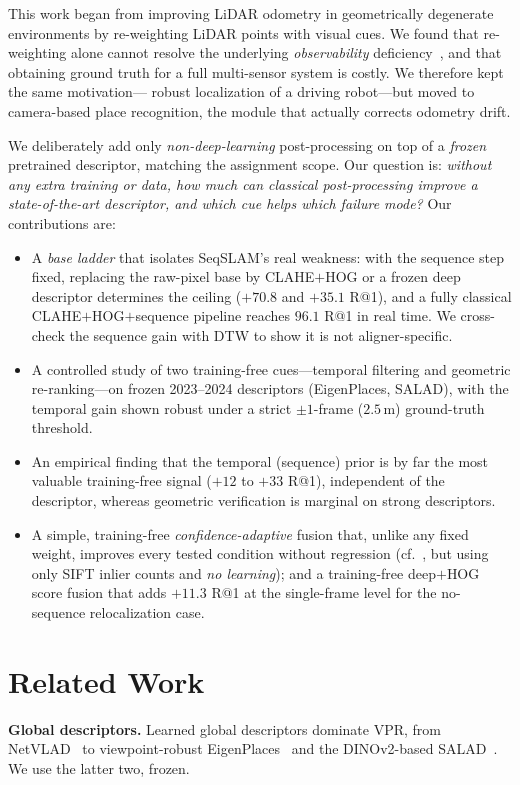 \documentclass[10pt,twocolumn,letterpaper]{article}
\begin{document}
This work began from improving LiDAR odometry in geometrically degenerate
environments by re-weighting LiDAR points with visual cues. We found that
re-weighting alone cannot resolve the underlying \emph{observability}
deficiency~\cite{zhang2016degeneracy}, and that obtaining ground truth for a
full multi-sensor system is costly. We therefore kept the same motivation---
robust localization of a driving robot---but moved to camera-based place
recognition, the module that actually corrects odometry drift.

We deliberately add only \emph{non-deep-learning} post-processing on top of a
\emph{frozen} pretrained descriptor, matching the assignment scope. Our
question is: \emph{without any extra training or data, how much can classical
post-processing improve a state-of-the-art descriptor, and which cue helps
which failure mode?} Our contributions are:
\begin{itemize}\itemsep2pt
  \item A \emph{base ladder} that isolates SeqSLAM's real weakness: with the
  sequence step fixed, replacing the raw-pixel base by CLAHE${+}$HOG or a frozen
  deep descriptor determines the ceiling ($+70.8$ and $+35.1$ R@1), and a fully
  classical CLAHE${+}$HOG${+}$sequence pipeline reaches $96.1$ R@1 in real time.
  We cross-check the sequence gain with DTW to show it is not aligner-specific.
  \item A controlled study of two training-free cues---temporal filtering and
  geometric re-ranking---on frozen 2023--2024 descriptors (EigenPlaces,
  SALAD), with the temporal gain shown robust under a strict $\pm1$-frame
  ($2.5\,$m) ground-truth threshold.
  \item An empirical finding that the temporal (sequence) prior is by far the
  most valuable training-free signal ($+12$ to $+33$ R@1), independent of the
  descriptor, whereas geometric verification is marginal on strong descriptors.
  \item A simple, training-free \emph{confidence-adaptive} fusion that, unlike
  any fixed weight, improves every tested condition without regression
  (cf.~\cite{zaffar2024uncertainty}, but using only SIFT inlier counts and
  \emph{no learning}); and a training-free deep${+}$HOG score fusion that adds
  $+11.3$ R@1 at the single-frame level for the no-sequence relocalization case.
\end{itemize}

\section{Related Work}
\label{sec:related}
\noindent\textbf{Global descriptors.} Learned global descriptors dominate VPR,
from NetVLAD~\cite{arandjelovic2016netvlad} to viewpoint-robust
EigenPlaces~\cite{berton2023eigenplaces} and the DINOv2-based
SALAD~\cite{izquierdo2024salad}. We use the latter two, frozen.
\end{document}

